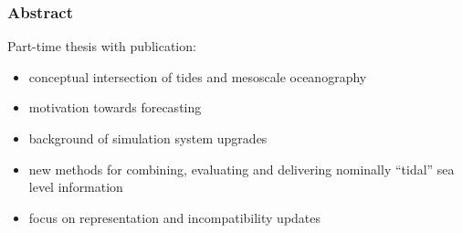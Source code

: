 \begin{frame}
\frametitle{Abstract}

Part-time thesis with publication:
\begin{itemize}
    \item conceptual intersection of tides and mesoscale oceanography
    \item motivation towards  forecasting
    \item background of simulation system upgrades
    \item new methods for combining, evaluating and delivering nominally ``tidal'' sea level information
    \item focus on representation and incompatibility
     updates 
\end{itemize}

\end{frame}